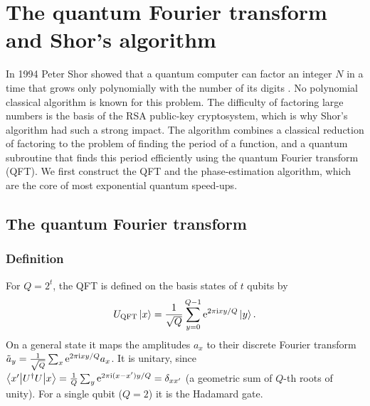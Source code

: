 \chapter[QFT and Shor's algorithm]{The quantum Fourier transform and Shor's algorithm}\label{ch:shor}

In 1994 Peter Shor showed that a quantum computer can factor an integer $N$ in a time that grows only polynomially with the number of its digits \cite{Shor1997}. No polynomial classical algorithm is known
for this problem. The difficulty of factoring large numbers is the basis of the RSA public-key cryptosystem, which is why Shor's algorithm had such a strong impact. The algorithm combines a classical
reduction of factoring to the problem of finding the period of a function, and a quantum subroutine that finds this period efficiently using the quantum Fourier transform (QFT). We first construct
the QFT and the phase-estimation algorithm, which are the core of most exponential quantum speed-ups.

\section{The quantum Fourier transform}
\subsection{Definition}
For $Q=2^t$, the QFT is defined on the basis states of $t$ qubits by
\begin{equation}\label{eq:qft}
  U_{\rm QFT}\left|x\right\rangle=\frac1{\sqrt Q}\sum_{y=0}^{Q-1}\mathrm e^{2\pi\mathrm i xy/Q}\left|y\right\rangle .
\end{equation}
On a general state it maps the amplitudes $a_x$ to their discrete Fourier transform $\tilde a_y=\frac1{\sqrt Q}\sum_x\mathrm e^{2\pi\mathrm i xy/Q}a_x$. It is unitary, since
$\left\langle x'\middle|U^\dagger U\middle|x\right\rangle=\frac1Q\sum_y\mathrm e^{2\pi\mathrm i(x-x')y/Q}=\delta_{xx'}$
(a geometric sum of $Q$-th roots of unity). For a single qubit ($Q=2$) it is the Hadamard gate.

